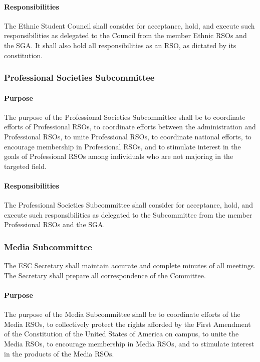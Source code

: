 \documentclass[12pt]{scrreprt}
\begin{document}
\paragraph{Responsibilities}
The Ethnic Student Council shall consider for acceptance, hold, and
execute such responsibilities as delegated to the Council from the member Ethnic RSOs
and the SGA. It shall also hold all responsibilities as an RSO, as dictated by its constitution.

\subsubsection{Professional Societies Subcommittee}

\paragraph{Purpose}
​The purpose of the Professional Societies Subcommittee shall be to coordinate
efforts of Professional RSOs, to coordinate efforts between the administration and
Professional RSOs, to unite Professional RSOs, to coordinate national efforts, to encourage
membership in Professional RSOs, and to stimulate interest in the goals of Professional
RSOs among individuals who are not majoring in the targeted field.


\paragraph{Responsibilities}
The Professional Societies Subcommittee shall consider for
acceptance, hold, and execute such responsibilities as delegated to the Subcommittee from
the member Professional RSOs and the SGA.

\subsubsection{Media Subcommittee}
The ESC Secretary shall maintain accurate and complete minutes of all
meetings. The Secretary shall prepare all correspondence of the Committee.

\paragraph{Purpose}
​The purpose of the Media Subcommittee shall be to coordinate efforts of the
Media RSOs, to collectively protect the rights afforded by the First Amendment of the
Constitution of the United States of America on campus, to unite the Media RSOs, to
encourage membership in Media RSOs, and to stimulate interest in the products of the
Media RSOs.
\end{document}
